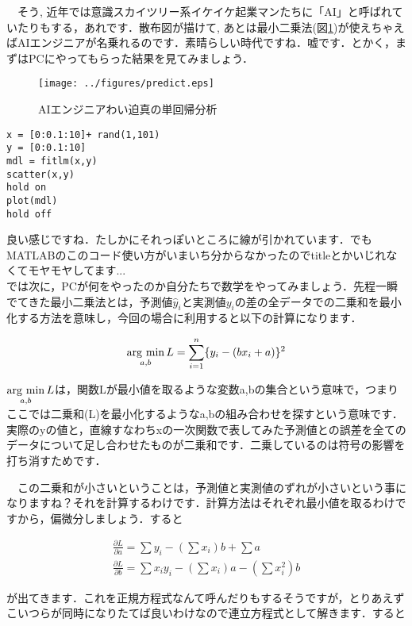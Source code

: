 \documentclass[11pt,a4paper]{ujreport}
\newcommand{\argmin}{\mathop{\rm arg~min}\limits}
\begin{document}
　そう, 近年では意識スカイツリー系イケイケ起業マンたちに「AI」と呼ばれていたりもする，あれです．散布図が描けて, あとは最小二乗法(図\ref{im:predict})が使えちゃえばAIエンジニアが名乗れるのです．素晴らしい時代ですね．嘘です．とかく，まずはPCにやってもらった結果を見てみましょう．\\


\begin{figure}[H]
\label{im:predict}
  \centering
  \texttt{[image: ../figures/predict.eps]}
  \caption{AIエンジニアわい迫真の単回帰分析}
\end{figure}


\begin{lstlisting}[caption=単回帰のコード,label=sc:regression]
x = [0:0.1:10]+ rand(1,101)
y = [0:0.1:10]
mdl = fitlm(x,y)
scatter(x,y)
hold on
plot(mdl)
hold off
\end{lstlisting}

良い感じですね．たしかにそれっぽいところに線が引かれています．でもMATLABのこのコード使い方がいまいち分からなかったのでtitleとかいじれなくてモヤモヤしてます... \\

では次に，PCが何をやったのか自分たちで数学をやってみましょう．先程一瞬でてきた最小二乗法とは，予測値$\hat y_i$と実測値$y_i$の差の全データでの二乗和を最小化する方法を意味し，今回の場合に利用すると以下の計算になります．

\begin{eqnarray}
\argmin_{a,b} L = \sum_{i=1}^n \{ y_i - (bx_i + a) \}^2
\end{eqnarray}

$\argmin_{a,b} L$は，関数Lが最小値を取るような変数a,bの集合という意味で，つまりここでは二乗和(L)を最小化するようなa,bの組み合わせを探すという意味です．実際のyの値と，直線すなわちxの一次関数で表してみた予測値との誤差を全てのデータについて足し合わせたものが二乗和です．二乗しているのは符号の影響を打ち消すためです．

　この二乗和が小さいということは，予測値と実測値のずれが小さいという事になりますね？それを計算するわけです．計算方法はそれぞれ最小値を取るわけですから，偏微分しましょう．すると

\begin{eqnarray}
\frac{\partial L}{\partial a} = \sum y_i -(\sum x_i)b + \sum a \\
\frac{\partial L}{\partial b} = \sum x_i y_i - (\sum x_i)a- (\sum x_i^2)b
\end{eqnarray}

が出てきます．これを正規方程式なんて呼んだりもするそうですが，とりあえずこいつらが同時になりたてば良いわけなので連立方程式として解きます．すると
\end{document}
